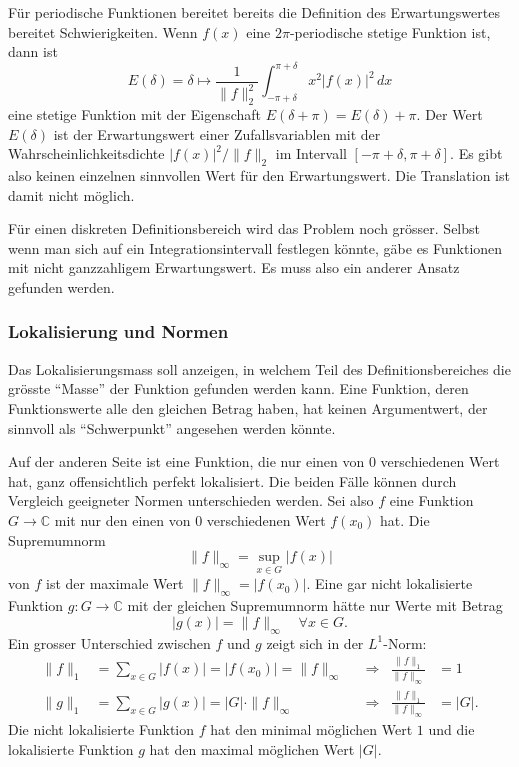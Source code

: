 Für periodische Funktionen bereitet bereits die Definition
des Erwartungswertes bereitet Schwierigkeiten.
Wenn $f(x)$ eine $2\pi$-periodische stetige Funktion ist, dann ist
\[
E(\delta)
=
\delta\mapsto 
\frac{1}{\|f\|_2^2}
\int_{-\pi+\delta}^{\pi+\delta}
x^2
|f(x)|^2
\,dx
\]
eine stetige Funktion mit der Eigenschaft $E(\delta+\pi)=E(\delta)+\pi$.
Der Wert $E(\delta)$ ist der Erwartungswert einer Zufallsvariablen
mit der Wahrscheinlichkeitsdichte $|f(x)|^2/\|f\|_2$ im Intervall
$[-\pi+\delta,\pi+\delta]$.
Es gibt also keinen einzelnen sinnvollen Wert für den Erwartungswert.
Die Translation ist damit nicht möglich.

Für einen diskreten Definitionsbereich wird das Problem noch grösser.
Selbst wenn man sich auf ein Integrationsintervall festlegen könnte,
gäbe es Funktionen mit nicht ganzzahligem Erwartungswert.
Es muss also ein anderer Ansatz gefunden werden.

%
%
\subsubsection{Lokalisierung und Normen}
Das Lokalisierungsmass soll anzeigen, in welchem Teil des Definitionsbereiches
die grösste ``Masse'' der Funktion gefunden werden kann.
Eine Funktion, deren Funktionswerte alle den gleichen Betrag
haben, hat keinen Argumentwert, der sinnvoll als ``Schwerpunkt''
angesehen werden könnte.

Auf der anderen Seite ist eine Funktion, die nur einen von $0$
verschiedenen Wert hat, ganz offensichtlich perfekt lokalisiert.
Die beiden Fälle können durch Vergleich geeigneter Normen 
unterschieden werden.
Sei also $f$ eine Funktion $G\to\mathbb{C}$ mit nur den einen von $0$
verschiedenen Wert $f(x_0)$ hat.
Die Supremumnorm
\[
\|f\|_\infty
=
\sup_{x\in G} |f(x)|
\]
von $f$ ist der maximale Wert $\|f\|_\infty = |f(x_0)|$.
Eine gar nicht lokalisierte Funktion $g\colon G\to\mathbb{C}$
mit der gleichen Supremumnorm hätte nur Werte mit Betrag
\[
|g(x)|
=
\|f\|_\infty\quad \forall x\in G.
\]
Ein grosser Unterschied zwischen $f$ und $g$ zeigt sich in
der $L^1$-Norm:
\begin{align*}
\|f\|_1
&=
\sum_{x\in G} |f(x)|
=
|f(x_0)|
=
\|f\|_\infty
&&\Rightarrow& \frac{\|f\|_1}{\|f\|_\infty}&=1
\\
\|g\|_1
&=
\sum_{x\in G} |g(x)|
=
|G|\cdot \|f\|_\infty
&&\Rightarrow& \frac{\|f\|_1}{\|f\|_\infty}&=|G|.
\end{align*}
Die nicht lokalisierte Funktion $f$ hat den minimal 
möglichen Wert $1$ und die lokalisierte Funktion $g$
hat den maximal möglichen Wert $|G|$.

